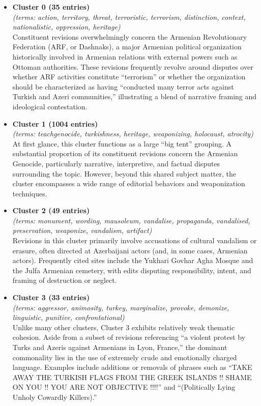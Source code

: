 \documentclass[11pt, a4paper, twoside, openright]{article} %
\begin{document}
\begin{itemize}
\item \textbf{Cluster 0 (35 entries)}\\
\textit{(terms: action, territory, threat, terroristic, terrorism, distinction, context, nationalistic, oppression, heritage)}\\
Constituent revisions overwhelmingly concern the Armenian Revolutionary Federation (ARF, or Dashnaks), a major Armenian political organization historically involved in Armenian relations with external powers such as Ottoman authorities. These revisions frequently revolve around disputes over whether ARF activities constitute ``terrorism'' or whether the organization should be characterized as having ``conducted many terror acts against Turkish and Azeri communities,'' illustrating a blend of narrative framing and ideological contestation.

\item \textbf{Cluster 1 (1004 entries)}\\
\textit{(terms: teachgenocide, turkishness, heritage, weaponizing, holocaust, atrocity)}\\
At first glance, this cluster functions as a large ``big tent'' grouping. A substantial proportion of its constituent revisions concern the Armenian Genocide, particularly narrative, interpretive, and factual disputes surrounding the topic. However, beyond this shared subject matter, the cluster encompasses a wide range of editorial behaviors and weaponization techniques.

\item \textbf{Cluster 2 (49 entries)}\\
\textit{(terms: monument, wording, mausoleum, vandalise, propaganda, vandalised, preservation, weaponize, vandalism, artifact)}\\
Revisions in this cluster primarily involve accusations of cultural vandalism or erasure, often directed at Azerbaijani actors (and, in some cases, Armenian actors). Frequently cited sites include the Yukhari Govhar Agha Mosque and the Julfa Armenian cemetery, with edits disputing responsibility, intent, and framing of destruction or neglect.

\item \textbf{Cluster 3 (33 entries)}\\
\textit{(terms: aggressor, animosity, turkey, marginalize, provoke, demonize, linguistic, punitive, confrontational)}\\
Unlike many other clusters, Cluster 3 exhibits relatively weak thematic cohesion. Aside from a subset of revisions referencing ``a violent protest by Turks and Azeris against Armenians in Lyon, France,'' the dominant commonality lies in the use of extremely crude and emotionally charged language. Examples include additions or removals of phrases such as ``TAKE AWAY THE TURKISH FLAGS FROM THE GREEK ISLANDS !! SHAME ON YOU !! YOU ARE NOT OBJECTIVE !!!!'' and ``(Politically Lying Unholy Cowardly Killers).''


\end{itemize}
\end{document}
